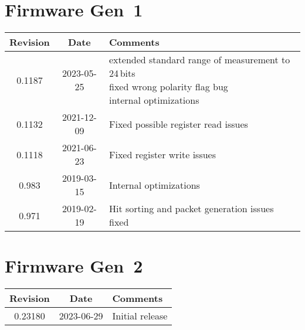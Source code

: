 \section{Firmware Gen~1}
\begin{tabularx}{\textwidth}{|c|c|X|}
    \hline
    Revision & Date & Comments\\
    \hline\hline
    \hypertarget{fwrev}{0.1187} & 2023-05-25 & 
    \makecell[l] {
        extended standard range of measurement to 24\,bits\\*
        fixed wrong polarity flag bug\\*
        internal optimizations
    }\\
    \hline
    0.1132 & 2021-12-09 & Fixed possible register read issues\\
    \hline
	0.1118 & 2021-06-23 & Fixed register write issues\\
    \hline
    0.983 & 2019-03-15 & Internal optimizations\\
    \hline
    0.971 & 2019-02-19 & Hit sorting and packet generation issues fixed\\
    \hline
\end{tabularx}

\section{Firmware Gen~2}
\begin{tabularx}{\textwidth}{|c|c|X|}
    \hline
    Revision & Date & Comments\\
    \hline\hline
    0.23180 & 2023-06-29 & Initial release\\ 
    \hline
\end{tabularx}